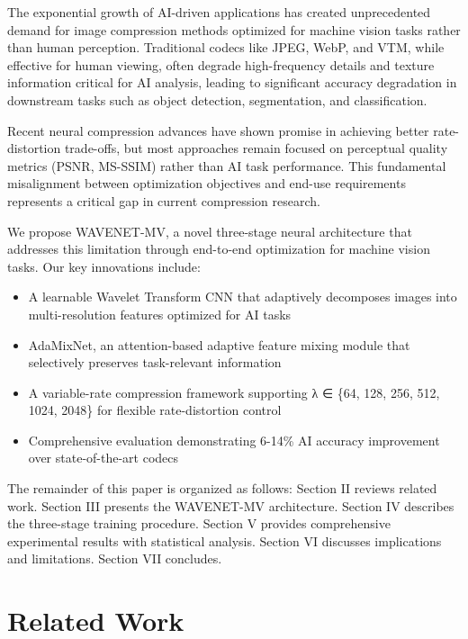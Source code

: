 \documentclass[conference]{IEEEtran}
\begin{document}
The exponential growth of AI-driven applications has created unprecedented demand for image compression methods optimized for machine vision tasks rather than human perception. Traditional codecs like JPEG, WebP, and VTM, while effective for human viewing, often degrade high-frequency details and texture information critical for AI analysis, leading to significant accuracy degradation in downstream tasks such as object detection, segmentation, and classification.

Recent neural compression advances \cite{balle2016end, balle2018variational, cheng2020learned} have shown promise in achieving better rate-distortion trade-offs, but most approaches remain focused on perceptual quality metrics (PSNR, MS-SSIM) rather than AI task performance. This fundamental misalignment between optimization objectives and end-use requirements represents a critical gap in current compression research.

We propose WAVENET-MV, a novel three-stage neural architecture that addresses this limitation through end-to-end optimization for machine vision tasks. Our key innovations include:

\begin{itemize}
\item A learnable Wavelet Transform CNN that adaptively decomposes images into multi-resolution features optimized for AI tasks
\item AdaMixNet, an attention-based adaptive feature mixing module that selectively preserves task-relevant information
\item A variable-rate compression framework supporting λ ∈ \{64, 128, 256, 512, 1024, 2048\} for flexible rate-distortion control
\item Comprehensive evaluation demonstrating 6-14\% AI accuracy improvement over state-of-the-art codecs
\end{itemize}

The remainder of this paper is organized as follows: Section II reviews related work. Section III presents the WAVENET-MV architecture. Section IV describes the three-stage training procedure. Section V provides comprehensive experimental results with statistical analysis. Section VI discusses implications and limitations. Section VII concludes.

\section{Related Work}
\end{document}
